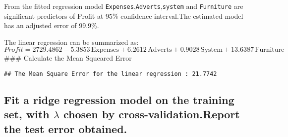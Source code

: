 \documentclass[
]{article}
\newenvironment{Shaded}{\begin{snugshade}}{\end{snugshade}}
\newcommand{\DecValTok}[1]{\textcolor[rgb]{0.00,0.00,0.81}{#1}}
\newcommand{\FunctionTok}[1]{\textcolor[rgb]{0.00,0.00,0.00}{#1}}
\newcommand{\NormalTok}[1]{#1}
\newcommand{\OtherTok}[1]{\textcolor[rgb]{0.56,0.35,0.01}{#1}}
\newcommand{\SpecialCharTok}[1]{\textcolor[rgb]{0.00,0.00,0.00}{#1}}
\newcommand{\StringTok}[1]{\textcolor[rgb]{0.31,0.60,0.02}{#1}}
\begin{document}
From the fitted regression model
\texttt{Expenses},\texttt{Adverts},\texttt{system} and
\texttt{Furniture} are significant predictors of Profit at 95\%
confidence interval.The estimated model has an adjusted error of 99.9\%.

The linear regression can be summarized as:
\[Profit = 2729.4862 - 5.3853\,\text{Expenses} + 6.2612\,\text{Adverts}+ 0.9028\,\text{System}+ 13.6387\,\text{Furniture}\]
\#\#\# Calculate the Mean Squeared Error

\begin{Shaded}
\end{Shaded}

\begin{verbatim}
## The Mean Square Error for the linear regression : 21.7742
\end{verbatim}

\hypertarget{fit-a-ridge-regression-model-on-the-training-set-with-ux3bb-chosen-by-cross-validation.report-the-test-error-obtained.}{%
\subsection{\texorpdfstring{Fit a ridge regression model on the training
set, with \(λ\) chosen by cross-validation.Report the test error
obtained.}{Fit a ridge regression model on the training set, with λ chosen by cross-validation.Report the test error obtained.}}\label{fit-a-ridge-regression-model-on-the-training-set-with-ux3bb-chosen-by-cross-validation.report-the-test-error-obtained.}}
\end{document}
